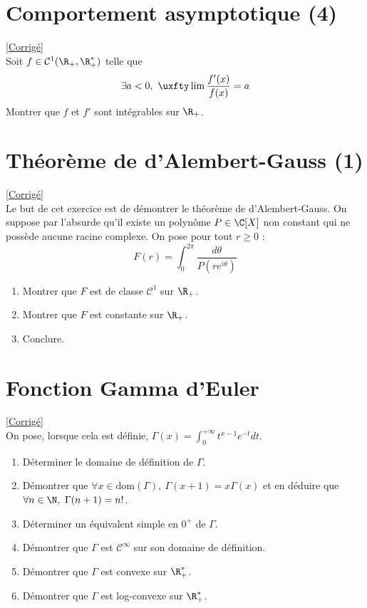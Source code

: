 \documentclass{book}
\begin{document}
	\section{Comportement asymptotique (4)}
	\textcolor{blue}{\hyperref[Comportement asymptotique (4) corrigé]{[Corrigé]}}\\
	\label{Comportement asymptotique (4)}
	Soit $f\in \mathcal C^1(\R_+,\R^*_+)$ telle que
	$$\exists a<0,\ \uxfty\lim\frac{f'(x)}{f(x)}=a$$
	Montrer que $f$ et $f'$ sont intégrables sur $\R_+$.
	
	\section{Théorème de d'Alembert-Gauss (1) }
	\textcolor{blue}{\hyperref[sec:theoreme-de-dalembert-gauss-1-etoile2]{[Corrigé]}}\\
	\label{alembertgauss1}
	\label{Théorème de d'Alembert-Gauss 1}
	Le but de cet exercice est de démontrer le théorème de d'Alembert-Gauss. On suppose par l'absurde qu'il existe un polynôme $P\in \C[X]$ non constant qui ne possède aucune racine complexe. On pose pour tout $r\geq 0$ :
	$$F(r)=\displaystyle\int_0^{2\pi}\frac{d\theta}{P(re^{i\theta})}$$
	\begin{enumerate}
		\item Montrer que $F$ est de classe $\mathcal C^1$ sur $\R_+$.
		\item Montrer que $F$ est constante sur $\R_+$.
		\item Conclure.
	\end{enumerate}
	
	\section{Fonction Gamma d'Euler}
	\textcolor{blue}{\hyperref[sec:fonction-gamma-deuler]{[Corrigé]}}\\
	\label{Fonction Gamma d'Euler}
	On pose, lorsque cela est définie, $\Gamma(x)=\displaystyle\int_0^{+\infty} t^{x-1}e^{-t}dt$.
	\begin{enumerate}
		\item Déterminer le domaine de définition de $\Gamma$.
		\item Démontrer que $\forall x\in \text{dom}(\Gamma),\ \Gamma(x+1)=x\Gamma(x)$ et en déduire que $\forall n \in \N,\ \Gamma(n+1)=n!$.
		\item Déterminer un équivalent simple en $0^+$ de $\Gamma$.
		\item Démontrer que $\Gamma$ est $\mathcal C^{\infty}$ sur son domaine de définition.
		\item Démontrer que $\Gamma$ est convexe sur $\R_+^*$.
		\item Démontrer que $\Gamma$ est log-convexe sur $\R^*_+$.
	\end{enumerate}
	
\end{document}
